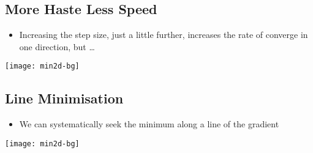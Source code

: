 
\begin{slide}
\section{More Haste Less Speed}

\pb
\begin{itemize}
\item Increasing the step size, just a little further, increases the
  rate of converge in one direction, but \ldots\pauseh
\end{itemize}
\begin{center}
  \texttt{[image: min2d-bg]}\pause
\end{center}

\end{slide}




\begin{slide}
\section{Line Minimisation}

\begin{itemize}
\item We can systematically seek the minimum along a line of the
  gradient\pauseh
\end{itemize}
\begin{center}
  \texttt{[image: min2d-bg]}\pause
\end{center}
\end{slide}


